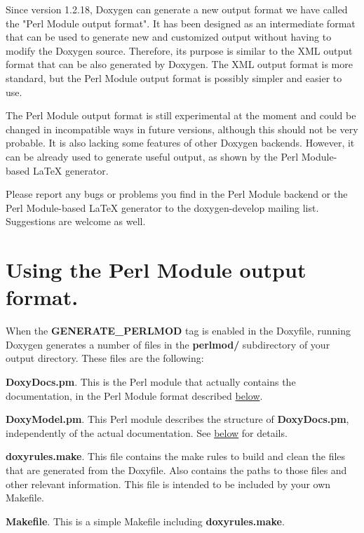 
Since version 1.2.18, Doxygen can generate a new output format we have called the "Perl Module output format". It has been designed as an intermediate format that can be used to generate new and customized output without having to modify the Doxygen source. Therefore, its purpose is similar to the XML output format that can be also generated by Doxygen. The XML output format is more standard, but the Perl Module output format is possibly simpler and easier to use.

The Perl Module output format is still experimental at the moment and could be changed in incompatible ways in future versions, although this should not be very probable. It is also lacking some features of other Doxygen backends. However, it can be already used to generate useful output, as shown by the Perl Module-\/based LaTeX generator.

Please report any bugs or problems you find in the Perl Module backend or the Perl Module-\/based LaTeX generator to the doxygen-\/develop mailing list. Suggestions are welcome as well.\hypertarget{perlmod_using_perlmod_fmt}{}\section{Using the Perl Module output format.}\label{perlmod_using_perlmod_fmt}
When the {\bfseries GENERATE\_\-PERLMOD} tag is enabled in the Doxyfile, running Doxygen generates a number of files in the {\bfseries perlmod/} subdirectory of your output directory. These files are the following:


\begin{DoxyItemize}
\item {\bfseries DoxyDocs.pm}. This is the Perl module that actually contains the documentation, in the Perl Module format described \hyperlink{perlmod_doxydocs_format}{below}.


\item {\bfseries DoxyModel.pm}. This Perl module describes the structure of {\bfseries DoxyDocs.pm}, independently of the actual documentation. See \hyperlink{perlmod_doxymodel_format}{below} for details.


\item {\bfseries doxyrules.make}. This file contains the make rules to build and clean the files that are generated from the Doxyfile. Also contains the paths to those files and other relevant information. This file is intended to be included by your own Makefile.


\item {\bfseries Makefile}. This is a simple Makefile including {\bfseries doxyrules.make}.


\end{DoxyItemize}

